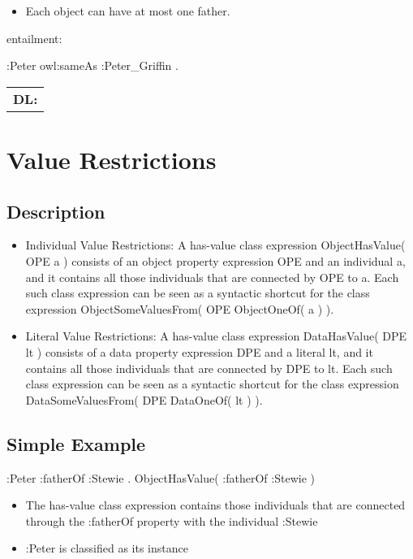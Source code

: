 \documentclass{llncs}
\newenvironment{DL}{
  \scriptsize
  \sffamily
  \vspace{0.3cm}
  \begin{tabular}{l}
	\textbf{DL:} \\

}{
  \end{tabular}
  \linebreak
}
\newcommand{\tb}[1]{\todo[size=\small, color=blue!40]{\textbf{Thomas:} #1}}
\begin{document}
\begin{itemize}
	\item Each object can have at most one father. 
\end{itemize}

entailment:

\begin{ex}
:Peter owl:sameAs :Peter_Griffin . 
\end{ex}

\begin{DL}

\end{DL}

\tb{ToDo: DL}

\section{Value Restrictions}

\subsection{Description}

\begin{itemize}
	\item Individual Value Restrictions: A has-value class expression ObjectHasValue( OPE a ) consists of an object property expression OPE and an individual a, and it contains all those individuals that are connected by OPE to a. Each such class expression can be seen as a syntactic shortcut for the class expression ObjectSomeValuesFrom( OPE ObjectOneOf( a ) ). 
	\item Literal Value Restrictions: A has-value class expression DataHasValue( DPE lt ) consists of a data property expression DPE and a literal lt, and it contains all those individuals that are connected by DPE to lt. Each such class expression can be seen as a syntactic shortcut for the class expression DataSomeValuesFrom( DPE DataOneOf( lt ) ).
\end{itemize}

\subsection{Simple Example}

\begin{ex}
:Peter :fatherOf :Stewie . 
ObjectHasValue( :fatherOf :Stewie )
\end{ex}

\begin{itemize}
	\item The has-value class expression contains those individuals that are connected through the :fatherOf property with the individual :Stewie
  \item :Peter is classified as its instance
\end{itemize}
\end{document}
